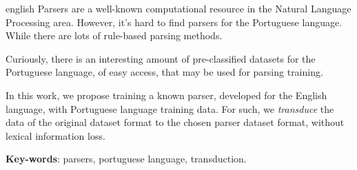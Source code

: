 \setlength{\absparsep}{18pt} %

\begin{resumo}[Abstract]
 \begin{otherlanguage*}{english}
    Parsers are a well-known computational resource in the Natural Language Processing area. However, it’s hard to find parsers for the Portuguese language.  While there are lots of rule-based parsing methods.
    
    Curiously, there is an interesting amount of pre-classified datasets for the Portuguese language, of easy access, that may be used for parsing training.
    
    In this work, we propose training a known parser, developed for the English language, with Portuguese language training data. For such, we \textit{transduce} the data of the original dataset format to the chosen parser dataset format, without lexical information loss.

   \vspace{\onelineskip}
 
   \noindent 
   \textbf{Key-words}: parsers, portuguese language, transduction.
 \end{otherlanguage*}
\end{resumo}